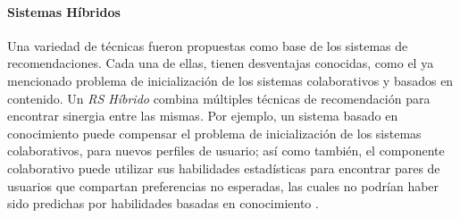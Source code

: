 \paragraph{Sistemas Híbridos}
Una variedad de técnicas fueron propuestas como base de los sistemas de recomendaciones. Cada una de ellas, tienen desventajas conocidas, como el ya mencionado problema de inicialización de los sistemas colaborativos y basados en contenido. Un \textit{RS Híbrido} combina múltiples técnicas de recomendación para encontrar sinergia entre las mismas. Por ejemplo, un sistema basado en conocimiento puede compensar el problema de inicialización de los sistemas colaborativos, para nuevos perfiles de usuario; así como también, el componente colaborativo puede utilizar sus habilidades estadísticas para encontrar pares de usuarios que compartan preferencias no esperadas, las cuales no podrían haber sido predichas por habilidades basadas en conocimiento \citep{burke2007hybrid}.